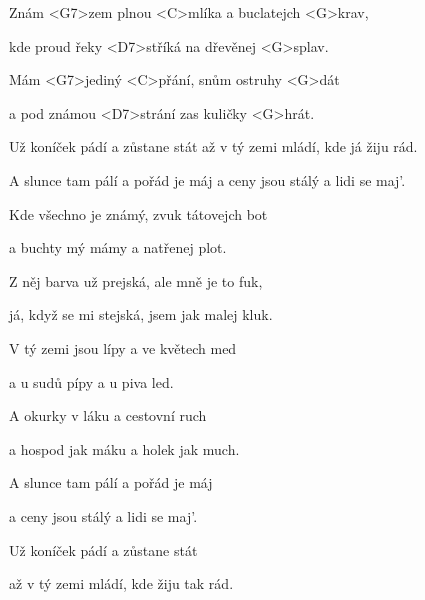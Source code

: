

\zs
Znám <G7>zem plnou <C>mlíka a buclatejch <G>krav,

kde proud řeky <D7>stříká na dřevěnej <G>splav.

Mám <G7>jediný <C>přání, snům ostruhy <G>dát

a pod známou <D7>strání zas kuličky <G>hrát.
\ks

\zr
Už koníček pádí a zůstane stát až v tý zemi mládí, kde já žiju rád.

A slunce tam pálí a pořád je máj a ceny jsou stálý a lidi se maj'.
\kr

\zs
Kde všechno je známý, zvuk tátovejch bot

a buchty mý mámy a natřenej plot.

Z něj barva už prejská, ale mně je to fuk,

já, když se mi stejská, jsem jak malej kluk.
\ks

\zr\kr

\zs
V tý zemi jsou lípy a ve květech med

a u sudů pípy a u piva led.

A okurky v láku a cestovní ruch

a hospod jak máku a holek jak much.
\ks

\zr
A slunce tam pálí a pořád je máj

a ceny jsou stálý a lidi se maj'.

Už koníček pádí a zůstane stát

až v tý zemi mládí, kde žiju tak rád.
\kr

\kp
